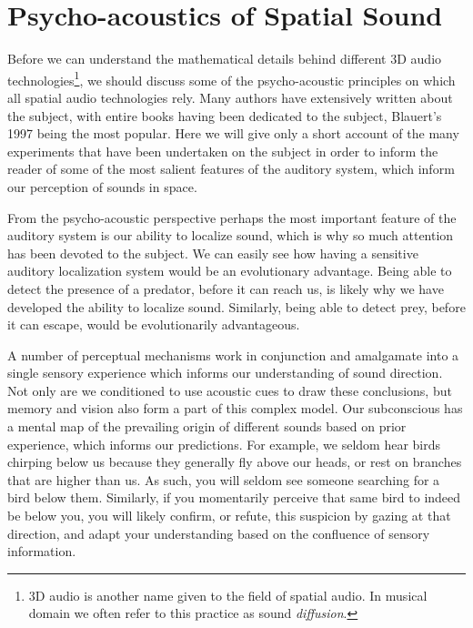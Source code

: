 \section{Psycho-acoustics of Spatial Sound}

Before we can understand the mathematical details behind different 3D audio technologies\footnote{3D audio is another name given to the field of spatial audio. In musical domain we often refer to this practice as sound \textit{diffusion}.}, we should discuss some of the psycho-acoustic principles on which all spatial audio technologies rely. Many authors have extensively written about the subject, with entire books having been dedicated to the subject, Blauert's 1997 \cite{blauert1997spatial} being the most popular. Here we will give only a short account of the many experiments that have been undertaken on the subject in order to inform the reader of some of the most salient features of the auditory system, which inform our perception of sounds in space.

From the psycho-acoustic perspective perhaps the most important feature of the auditory system is our ability to localize sound, which is why so much attention has been devoted to the subject. We can easily see how having a sensitive auditory localization system would be an evolutionary advantage. Being able to detect the presence of a predator, before it can reach us, is likely why we have developed the ability to localize sound. Similarly, being able to detect prey, before it can escape, would be evolutionarily advantageous.

A number of perceptual mechanisms work in conjunction and amalgamate into a single sensory experience which informs our understanding of sound direction. Not only are we conditioned to use acoustic cues to draw these conclusions, but memory and vision also form a part of this complex model. Our subconscious has a mental map of the prevailing origin of different sounds based on prior experience, which informs our predictions. For example, we seldom hear birds chirping below us because they generally fly above our heads, or rest on branches that are higher than us. As such, you will seldom see someone searching for a bird below them. Similarly, if you momentarily perceive that same bird to indeed be below you, you will likely confirm, or refute, this suspicion by gazing at that direction, and adapt your understanding based on the confluence of sensory information. 

